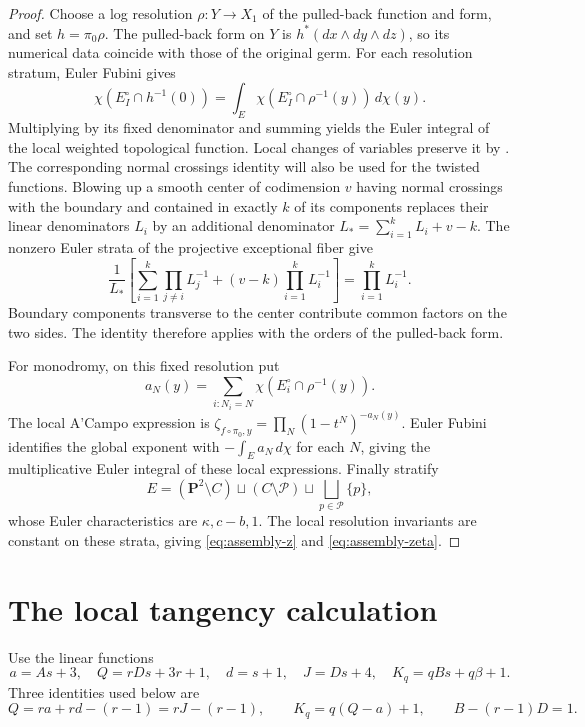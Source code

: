 \documentclass[11pt]{article}
\numberwithin{equation}{section}
\theoremstyle{definition}
\theoremstyle{remark}
\newcommand{\PP}{\mathbf P}
\begin{document}
\begin{proof}
Choose a log resolution $\rho:Y\to X_1$ of the pulled-back
function and form, and set $h=\pi_0\rho$.
The pulled-back form on $Y$ is $h^*(dx\wedge dy\wedge dz)$,
so its numerical data coincide with those of the original germ.
For each resolution stratum, Euler Fubini gives
\[
 \chi(E_I^\circ\cap h^{-1}(0))
   =\int_E\chi(E_I^\circ\cap\rho^{-1}(y))\,d\chi(y).
\]
Multiplying by its fixed denominator and summing yields the
Euler integral of the local weighted topological function.
Local changes of variables preserve it by
\cite[Proposition~1.3]{AGGL26}. The corresponding normal
crossings identity will also be used for the twisted functions.
Blowing up a smooth center of codimension $v$
having normal crossings with the boundary and contained in
exactly $k$ of its components replaces their
linear denominators $L_i$ by an additional denominator
$L_*=\sum_{i=1}^kL_i+v-k$. The nonzero Euler strata of the
projective exceptional fiber give
\begin{equation}\label{eq:snc-identity}
 \frac1{L_*}\left[
   \sum_{i=1}^k\prod_{j\ne i}L_j^{-1}
       +(v-k)\prod_{i=1}^kL_i^{-1}\right]
       =\prod_{i=1}^kL_i^{-1}.
\end{equation}
Boundary components transverse to the center contribute
common factors on the two sides. The identity therefore
applies with the orders of the pulled-back form.

For monodromy, on this fixed resolution put
\[
 a_N(y)=\sum_{i:N_i=N}
       \chi(E_i^\circ\cap\rho^{-1}(y)).
\]
The local A'Campo expression is
$\zeta_{f\circ\pi_0,y}=\prod_N(1-t^N)^{-a_N(y)}$.
Euler Fubini identifies the global exponent with
$-\int_E a_N\,d\chi$ for each $N$, giving the multiplicative
Euler integral of these local expressions. Finally stratify
\[
 E=(\PP^2\setminus C)\sqcup(C\setminus\mathcal P)
      \sqcup\bigsqcup_{p\in\mathcal P}\{p\},
\]
whose Euler characteristics are $\kappa,c-b,1$. The local
resolution invariants are constant on these strata, giving
\eqref{eq:assembly-z} and \eqref{eq:assembly-zeta}.
\end{proof}

\section{The local tangency calculation}\label{sec:local}

Use the linear functions
\begin{equation}\label{eq:linear-functions}
 a=As+3,\quad Q=rDs+3r+1,\quad d=s+1,\quad
 J=Ds+4,\quad K_q=qBs+q\beta+1.
\end{equation}
Three identities used below are
\begin{equation}\label{eq:linear-identities}
 Q=ra+rd-(r-1)=rJ-(r-1),\qquad
 K_q=q(Q-a)+1,\qquad B-(r-1)D=1.
\end{equation}
\end{document}
